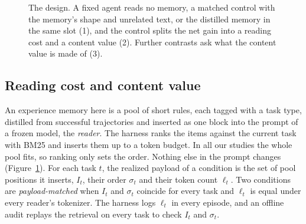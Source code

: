 \begin{figure}[t]
\centering

\caption{The design. A fixed agent reads no memory, a matched control with the memory's shape and
unrelated text, or the distilled memory in the same slot (1), and the control splits the net gain into a
reading cost and a content value (2). Further contrasts ask what the content value is made of (3).}
\label{fig:design}
\end{figure}

\subsection{Reading cost and content value}
\label{sec:decomposition}

An experience memory here is a pool of short rules, each tagged with a task type, distilled from
successful trajectories and inserted as one block into the prompt of a frozen model, the
\emph{reader}. The harness ranks the items against the current task with BM25
\citep{robertson2009bm25} and inserts them up to a token budget. In all our studies the whole pool fits,
so ranking only sets the order. Nothing else in the prompt changes (Figure~\ref{fig:design}). For each
task $t$, the realized payload of a condition is the set of pool positions it inserts, $I_t$, their order
$\sigma_t$ and their token count $\ell_t$. Two conditions are \emph{payload-matched} when $I_t$ and
$\sigma_t$ coincide for every task and $\ell_t$ is equal under every reader's tokenizer. The harness logs
$\ell_t$ in every episode, and an offline audit replays the retrieval on every task to check $I_t$ and
$\sigma_t$.

